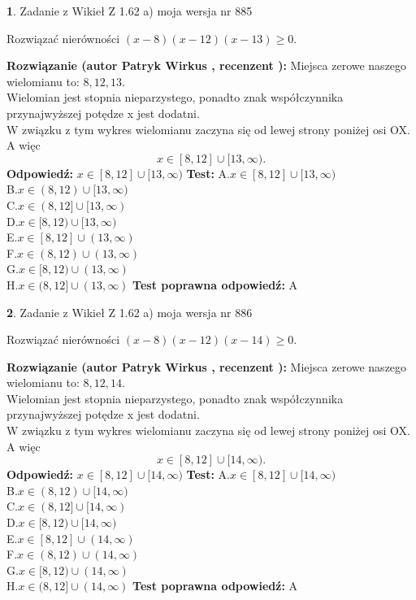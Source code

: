 \documentclass[12pt, a4paper]{article}
\theoremstyle{definition} %
\newtheorem{zad}{}
\newcommand{\zadStart}[1]{\begin{zad}#1\newline}
\newcommand{\zadStop}{\end{zad}}
\newcommand{\rozwStart}[2]{\noindent \textbf{Rozwiązanie (autor #1 , recenzent #2): }\newline}
\newcommand{\rozwStop}{\newline}
\newcommand{\odpStart}{\noindent \textbf{Odpowiedź:}\newline}
\newcommand{\odpStop}{\newline}
\newcommand{\testStart}{\noindent \textbf{Test:}\newline}
\newcommand{\testStop}{\newline}
\newcommand{\kluczStart}{\noindent \textbf{Test poprawna odpowiedź:}\newline}
\newcommand{\kluczStop}{\newline}
\begin{document}
\zadStart{Zadanie z Wikieł Z 1.62 a) moja wersja nr 885}

Rozwiązać nierówności $(x-8)(x-12)(x-13)\ge0$.
\zadStop
\rozwStart{Patryk Wirkus}{}
Miejsca zerowe naszego wielomianu to: $8, 12, 13$.\\
Wielomian jest stopnia nieparzystego, ponadto znak współczynnika przy\linebreak najwyższej potędze x jest dodatni.\\ W związku z tym wykres wielomianu zaczyna się od lewej strony poniżej osi OX. A więc $$x \in [8,12] \cup [13,\infty).$$
\rozwStop
\odpStart
$x \in [8,12] \cup [13,\infty)$
\odpStop
\testStart
A.$x \in [8,12] \cup [13,\infty)$\\
B.$x \in (8,12) \cup [13,\infty)$\\
C.$x \in (8,12] \cup [13,\infty)$\\
D.$x \in [8,12) \cup [13,\infty)$\\
E.$x \in [8,12] \cup (13,\infty)$\\
F.$x \in (8,12) \cup (13,\infty)$\\
G.$x \in [8,12) \cup (13,\infty)$\\
H.$x \in (8,12] \cup (13,\infty)$
\testStop
\kluczStart
A
\kluczStop



\zadStart{Zadanie z Wikieł Z 1.62 a) moja wersja nr 886}

Rozwiązać nierówności $(x-8)(x-12)(x-14)\ge0$.
\zadStop
\rozwStart{Patryk Wirkus}{}
Miejsca zerowe naszego wielomianu to: $8, 12, 14$.\\
Wielomian jest stopnia nieparzystego, ponadto znak współczynnika przy\linebreak najwyższej potędze x jest dodatni.\\ W związku z tym wykres wielomianu zaczyna się od lewej strony poniżej osi OX. A więc $$x \in [8,12] \cup [14,\infty).$$
\rozwStop
\odpStart
$x \in [8,12] \cup [14,\infty)$
\odpStop
\testStart
A.$x \in [8,12] \cup [14,\infty)$\\
B.$x \in (8,12) \cup [14,\infty)$\\
C.$x \in (8,12] \cup [14,\infty)$\\
D.$x \in [8,12) \cup [14,\infty)$\\
E.$x \in [8,12] \cup (14,\infty)$\\
F.$x \in (8,12) \cup (14,\infty)$\\
G.$x \in [8,12) \cup (14,\infty)$\\
H.$x \in (8,12] \cup (14,\infty)$
\testStop
\kluczStart
A
\kluczStop
\end{document}
